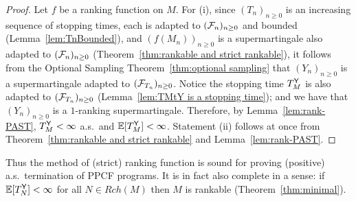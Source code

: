 \begin{proof}
Let $f$ be a ranking function on $M$.
For (i), since $(T_n)_{n \geq 0}$ is an increasing sequence of stopping times, each is adapted to $(\mathcal{F}_n)_{n \geq 0}$ and bounded (Lemma~\ref{lem:TnBounded}),
and $(f(M_n))_{n \geq 0}$ is a supermartingale also adapted to $(\mathcal{F}_n)_{n \geq 0}$ (Theorem~\ref{thm:rankable and strict rankable}),
it follows from the Optional Sampling Theorem~\ref{thm:optional sampling} that $(Y_n)_{n \geq 0}$ %
is a supermartingale adapted to $(\mathcal{F}_{T_n})_{n \geq 0}$.
Notice the stopping time $T_M^{\mathsf{Y}}$ is also adapted to $(\mathcal{F}_{T_n})_{n \geq 0}$ (Lemma~\ref{lem:TMtY is a stopping time}); and we have that $(Y_n)_{n \geq 0}$ is a $1$-ranking supermartingale.
Therefore, by Lemma~\ref{lem:rank-PAST}, $T^{\mathsf{Y}}_M < \infty$ a.s.~and $\mathbb{E}[T^{\mathsf{Y}}_M] < \infty$.
Statement (ii) follows at once from Theorem~\ref{thm:rankable and strict rankable} and Lemma~\ref{lem:rank-PAST}.
\end{proof}

Thus the method of (strict) ranking function is sound for proving (positive) a.s.~termination of PPCF programs.
It is in fact also complete in a sense: if $\mathbb{E}[T^{\mathsf{Y}}_N] < \infty$ for all $N \in \mathit{Rch}(M)$ then $M$ is rankable (Theorem~\ref{thm:minimal}).
